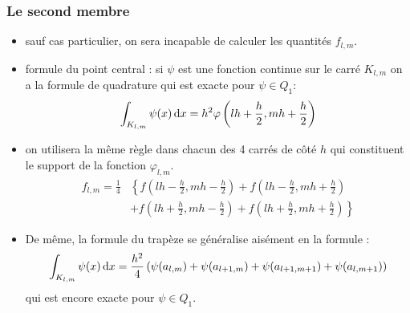 \documentclass{beamer}
\def \de {{\rm d}}
\begin{document}
\begin{frame}
\frametitle{Le second membre}
\begin{itemize}
\item sauf cas particulier, on sera incapable de calculer les quantités $f_{l,m}$.
\item formule du point central : si $\psi$ est une fonction continue sur le carré $K_{l,m}$ on a la formule de quadrature qui est exacte pour $\psi\in Q_1$:
\begin{equation}
\int_{K_{l,m}}\psi(x)\,\de x = h^2\varphi\left(lh+\frac h2,mh+\frac h2\right)
\end{equation}
\item  on utilisera la même règle dans chacun des 4 carrés de côté $h$ qui constituent le support de la fonction $\varphi_{l,m}$.
\[
\begin{array}{rl}
\displaystyle f_{l,m}=\frac 14&\displaystyle \left\{f\left(lh-\frac h2,mh-\frac h2\right)+f\left(lh-\frac h2,mh+\frac h2\right)\right.\\
&\displaystyle+\left.f\left(lh+\frac h2,mh-\frac h2\right)+f\left(lh+\frac h2,mh+\frac h2\right)\right\}
\end{array}
\]
\item De même, la formule du trapèze se généralise aisément en la formule : 
\begin{equation}
\int_{K_{l,m}}\psi(x)\,\de x =\frac{ h^2}4\left(\psi(a_{l,m})+\psi(a_{l+1,m})+\psi(a_{l+1,m+1})+\psi(a_{l,m+1})\right)
\end{equation}
qui est encore exacte pour $\psi\in Q_1$. 
\end{itemize}


\end{frame}
\end{document}
